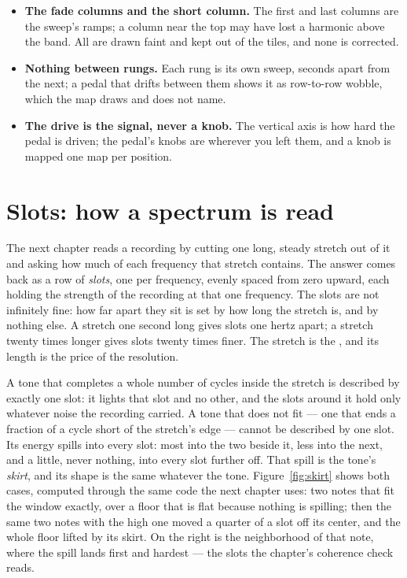 \documentclass[11pt,a4paper]{article}
\begin{document}
\begin{itemize}
  carries one model of the pedal per rung, played by the listening
  panels; none of the map's numbers come from them. A rendering between
  two rungs blends two models, and the quieter one clips the signal in a
  way the pedal does not; that is a property of what the models play,
  measured in its own chapter, and never of the map.
  \item \textbf{The fade columns and the short column.} The first and last
  columns are the sweep's ramps; a column near the top may have lost a
  harmonic above the band. All are drawn faint and kept out of the tiles,
  and none is corrected.
  \item \textbf{Nothing between rungs.} Each rung is its own sweep,
  seconds apart from the next; a pedal that drifts between them shows it
  as row-to-row wobble, which the map draws and does not name.
  \item \textbf{The drive is the signal, never a knob.} The vertical axis
  is how hard the pedal is driven; the pedal's knobs are wherever you
  left them, and a knob is mapped one map per position.
\end{itemize}

\clearpage

\section{Slots: how a spectrum is read}
\label{sec:slots-plain}

The next chapter reads a recording by cutting one long, steady stretch out
of it and asking how much of each frequency that stretch contains. The
answer comes back as a row of \emph{slots}, one per frequency, evenly
spaced from zero upward, each holding the strength of the recording at
that one frequency. The slots are not infinitely fine: how far apart they
sit is set by how long the stretch is, and by nothing else. A stretch one
second long gives slots one hertz apart; a stretch twenty times longer
gives slots twenty times finer. The stretch is the ,
and its length is the price of the resolution.

A tone that completes a whole number of cycles inside the stretch is
described by exactly one slot: it lights that slot and no other, and the
slots around it hold only whatever noise the recording carried. A tone
that does not fit --- one that ends a fraction of a cycle short of the
stretch's edge --- cannot be described by one slot. Its energy spills
into every slot: most into the two beside it, less into the next, and a
little, never nothing, into every slot further off. That spill is the
tone's \emph{skirt}, and its shape is the same whatever the tone.
Figure~\ref{fig:skirt} shows both cases, computed through the same code
the next chapter uses: two notes that fit the window exactly, over a
floor that is flat because nothing is spilling; then the same two notes
with the high one moved a quarter of a slot off its center, and the whole
floor lifted by its skirt. On the right is the neighborhood of that
note, where the spill lands first and hardest --- the slots the chapter's
coherence check reads.
\end{document}
